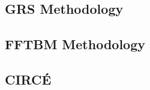 \subsection{GRS Methodology}\label{sub:intro_grs_method}

\subsection{FFTBM Methodology}\label{sub:intro_fftbm_method}

\subsection{CIRC\'E}\label{sub:intro_circe_method}
